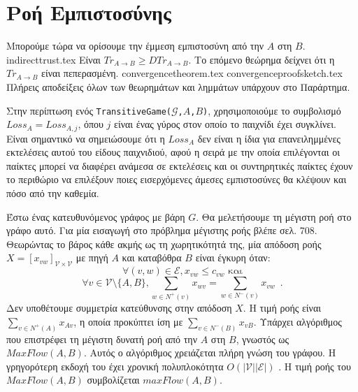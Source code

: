 \section{Ροή Εμπιστοσύνης}
  Μπορούμε τώρα να ορίσουμε την έμμεση εμπιστοσύνη από την $A$ στη $B$.
  {indirecttrust.tex}
  \noindent Είναι $Tr_{A \rightarrow B} \geq DTr_{A \rightarrow B}$. Το επόμενο θεώρημα δείχνει ότι η $Tr_{A \rightarrow B}$
  είναι πεπερασμένη.
  {convergencetheorem.tex}
  {convergenceproofsketch.tex}
  Πλήρεις αποδείξεις όλων των θεωρημάτων και λημμάτων υπάρχουν στο Παράρτημα.

  Στην περίπτωση ενός \texttt{\textlatin{TransitiveGame}(}$\mathcal{G}$\texttt{,}$A$\texttt{,}$B$\texttt{)}, χρησιμοποιούμε το
  συμβολισμό $Loss_A = Loss_{A, j}$, όπου $j$ είναι ένας γύρος στον οποίο το παιχνίδι έχει συγκλίνει. Είναι σημαντικό να
  σημειώσουμε ότι η $Loss_A$ δεν είναι η ίδια για επανειλημμένες εκτελέσεις αυτού του είδους παιχνιδιού, αφού η σειρά με την
  οποία επιλέγονται οι παίκτες μπορεί να διαφέρει ανάμεσα σε εκτελέσεις και οι συντηρητικές παίκτες έχουν το περιθώριο να
  επιλέξουν ποιες εισερχόμενες άμεσες εμπιστοσύνες θα κλέψουν και πόσο από την καθεμία.

  Έστω ένας κατευθυνόμενος γράφος με βάρη $G$. Θα μελετήσουμε τη μέγιστη ροή στο γράφο αυτό. Για μία εισαγωγή στο πρόβλημα
  μέγιστης ροής βλέπε \cite{clrs} σελ. 708. Θεωρώντας το βάρος κάθε ακμής ως τη χωρητικότητά της, μία απόδοση ροής $X =
  [x_{vw}]_{\mathcal{V} \times \mathcal{V}}$ με πηγή $A$ και καταβόθρα $B$ είναι έγκυρη όταν:
  \begin{equation}
  \label{flow1}
    \forall (v, w) \in \mathcal{E}, x_{vw} \leq c_{vw} \mbox{ και}
  \end{equation}
  \begin{equation}
  \label{flow2}
    \forall v \in \mathcal{V} \setminus \{A,B\}, \sum\limits_{w \in N^{+}(v)}x_{wv} = \sum\limits_{w \in N^{-}(v)}x_{vw}
    \enspace.
  \end{equation}
  Δεν υποθέτουμε συμμετρία κατεύθυνσης στην απόδοση $X$. Η τιμή ροής είναι $\sum\limits_{v \in N^{+}\left(A\right)}x_{Av}$, η
  οποία προκύπτει ίση με $\sum\limits_{v \in N^{-}\left(B\right)}x_{vB}$. Υπάρχει αλγόριθμος που επιστρέφει τη μέγιστη δυνατή
  ροή από την $A$ στη $B$, γνωστός ως $MaxFlow\left(A, B\right)$. Αυτός ο αλγόριθμος χρειάζεται πλήρη γνώση του γράφου. Η
  γρηγορότερη εκδοχή του έχει χρονική πολυπλοκότητα $O\left(|\mathcal{V}||\mathcal{E}|\right)$ \cite{maxflownm}. Η τιμή ροής
  του $MaxFlow\left(A, B\right)$ συμβολίζεται $maxFlow\left(A, B\right)$.

